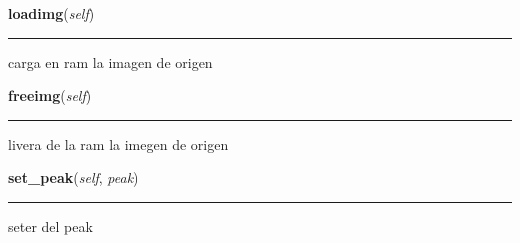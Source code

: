     \label{spectro_metria:spect:loadimg}

    \vspace{0.5ex}

\hspace{.8\funcindent}\begin{boxedminipage}{\funcwidth}

    \raggedright \textbf{loadimg}(\textit{self})

    \vspace{-1.5ex}

    \rule{\textwidth}{0.5\fboxrule}
\setlength{\parskip}{2ex}
    carga en ram la imagen de origen

\setlength{\parskip}{1ex}
    \end{boxedminipage}

    \label{spectro_metria:spect:freeimg}

    \vspace{0.5ex}

\hspace{.8\funcindent}\begin{boxedminipage}{\funcwidth}

    \raggedright \textbf{freeimg}(\textit{self})

    \vspace{-1.5ex}

    \rule{\textwidth}{0.5\fboxrule}
\setlength{\parskip}{2ex}
    livera de la ram la imegen de origen

\setlength{\parskip}{1ex}
    \end{boxedminipage}

    \label{spectro_metria:spect:set_peak}

    \vspace{0.5ex}

\hspace{.8\funcindent}\begin{boxedminipage}{\funcwidth}

    \raggedright \textbf{set\_peak}(\textit{self}, \textit{peak})

    \vspace{-1.5ex}

    \rule{\textwidth}{0.5\fboxrule}
\setlength{\parskip}{2ex}
    seter del peak

\setlength{\parskip}{1ex}
    \end{boxedminipage}

